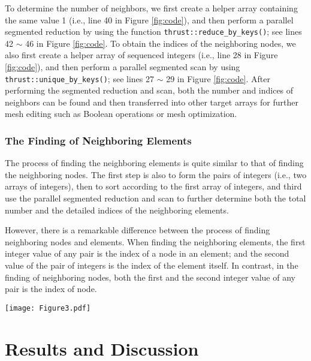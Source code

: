 \documentclass[twocolumn]{svjour3}          \smartqed  \usepackage{graphicx}
\begin{document}
To determine the number of neighbors, we first create a helper array 
containing the same value 1 (i.e., line 40 in Figure \ref{fig:code}), and then perform a 
parallel segmented reduction by using the function 
\texttt{thrust::reduce{\_}by{\_}keys()}; see lines 42 $\sim $ 46 in Figure \ref{fig:code}. To obtain the indices of the neighboring nodes, we also first create a 
helper array of sequenced integers (i.e., line 28 in Figure \ref{fig:code}), and then 
perform a parallel segmented scan by using  
\texttt{thrust::unique{\_}by{\_}keys()}; see lines 27 $\sim $ 29 in Figure \ref{fig:code}. After performing the segmented reduction and scan, both the number and 
indices of neighbors can be found and then transferred into other target 
arrays for further mesh editing such as Boolean operations or mesh 
optimization. 

\subsubsection{The Finding of Neighboring Elements}

The process of finding the neighboring elements is quite similar to that of 
finding the neighboring nodes. The first step is also to form the pairs of 
integers (i.e., two arrays of integers), then to sort according to the first 
array of integers, and third use the parallel segmented reduction and scan 
to further determine both the total number and the detailed indices of the 
neighboring elements. 

However, there is a remarkable difference between the process of finding 
neighboring nodes and elements. When finding the neighboring elements, the 
first integer value of any pair is the index of a node in an element; and 
the second value of the pair of integers is the index of the element itself. 
In contrast, in the finding of neighboring nodes, both the first and the 
second integer value of any pair is the index of node. 

\begin{figure*}[htbp]
	\centering
    \texttt{[image: Figure3.pdf]}
	\caption{Partial GPU implementation for finding neighboring nodes}
	\label{fig:code}       \end{figure*}




\section{Results and Discussion}
\end{document}
